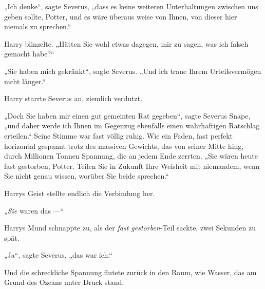 „Ich denke“, sagte Severus, „dass es keine weiteren Unterhaltungen zwischen uns geben sollte, Potter, und es wäre überaus weise von Ihnen, von dieser hier niemals zu sprechen.“

Harry blinzelte.
„Hätten Sie wohl etwas dagegen, mir zu sagen, was ich falsch gemacht habe?“

„Sie haben mich gekränkt“, sagte Severus.
„Und ich traue Ihrem Urteilsvermögen nicht länger.“

Harry starrte Severus an, ziemlich verdutzt.

„Doch Sie haben mir einen gut gemeinten Rat gegeben“, sagte Severus Snape, „und daher werde ich Ihnen im Gegenzug ebenfalls einen wahrhaftigen Ratschlag erteilen.“ Seine Stimme war fast völlig ruhig. Wie ein Faden, fast perfekt horizontal gespannt trotz des massiven Gewichts, das von seiner Mitte hing, durch Millionen Tonnen Spannung, die an jedem Ende zerrten.
„Sie wären heute fast gestorben, Potter. Teilen Sie in Zukunft Ihre Weisheit mit niemandem, wenn Sie nicht genau wissen, worüber Sie beide sprechen.“

Harrys Geist stellte endlich die Verbindung her.

„\emph{Sie} waren das —“

Harrys Mund schnappte zu, als der \emph{fast gestorben}-Teil sackte, zwei Sekunden zu spät.

„Ja“, sagte Severus, „das war ich.“

Und die schreckliche Spannung flutete zurück in den Raum, wie Wasser, das am Grund des Ozeans unter Druck stand.

